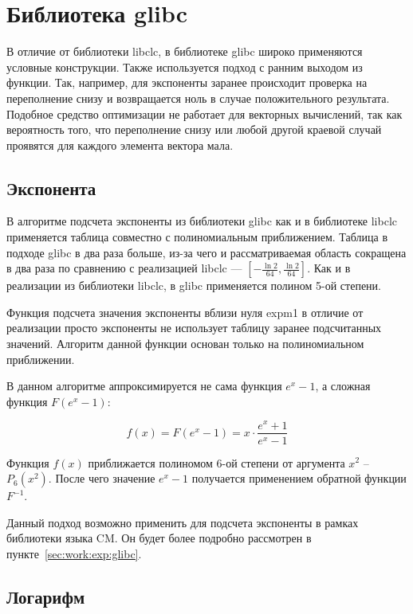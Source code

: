 \section{Библиотека glibc}

В отличие от библиотеки libclc, в библиотеке glibc широко применяются условные конструкции.
Также используется подход с ранним выходом из функции.
Так, например, для экспоненты заранее происходит проверка на переполнение снизу и возвращается ноль в случае положительного результата.
Подобное средство оптимизации не работает для векторных вычислений, так как вероятность того, что переполнение снизу или любой другой краевой случай проявятся для каждого элемента вектора мала.

\subsection{Экспонента}

В алгоритме подсчета экспоненты из библиотеки glibc как и в библиотеке libclc применяется таблица совместно с полиномиальным приближением.
Таблица в подходе glibc в два раза больше, из-за чего и рассматриваемая область сокращена в два раза по сравнению с реализацией libclc --- $[-\frac{\ln{2}}{64}, \frac{\ln{2}}{64}]$.
Как и в реализации из библиотеки libclc, в glibc применяется полином 5-ой степени.

Функция подсчета значения экспоненты вблизи нуля expm1 в отличие от реализации просто экспоненты не использует таблицу заранее подсчитанных значений.
Алгоритм данной функции основан только на полиномиальном приближении.

В данном алгоритме аппроксимируется не сама функция $e^{x} - 1$, а сложная функция $F(e^{x}-1)$:

\begin{equation}
    f(x) = F(e^{x}-1) = x \cdot \frac{e^{x}+1}{e^{x}-1}
\end{equation}

Функция $f(x)$ приближается полиномом 6-ой степени от аргумента $x^{2}$ -- $P_{6}(x^{2})$.
После чего значение $e^{x}-1$ получается применением обратной функции $F^{-1}$.

Данный подход возможно применить для подсчета экспоненты в рамках библиотеки языка CM.
Он будет более подробно рассмотрен в пункте~\ref{sec:work:exp:glibc}.

\subsection{Логарифм}

